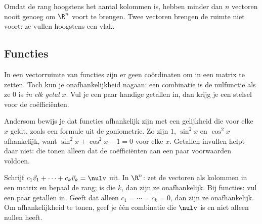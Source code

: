 Omdat de rang hoogstens het aantal kolommen is, hebben minder dan $n$ vectoren nooit genoeg om $\R^n$ voort te brengen. Twee vectoren brengen de ruimte niet voort: ze vullen hoogstens een vlak.


\begin{oefeningen}
\end{oefeningen}

\subsection{Functies}

In een vectorruimte van functies zijn er geen coördinaten om in een matrix te zetten. Toch kun je onafhankelijkheid nagaan: een combinatie is de nulfunctie als ze 0 is \textit{in elk getal} $x$. Vul je een paar handige getallen in, dan krijg je een stelsel voor de coëfficiënten.


Andersom bewijs je dat functies afhankelijk zijn met een gelijkheid die voor elke $x$ geldt, zoals een formule uit de goniometrie. Zo zijn $1$, $\sin^2 x$ en $\cos^2 x$ afhankelijk, want $\sin^2 x + \cos^2 x - 1 = 0$ voor elke $x$. Getallen invullen helpt daar niet: die tonen alleen dat de coëfficiënten aan een paar voorwaarden voldoen.

\begin{werkwijze}
Schrijf $c_1\vec v_1 + \cdots + c_k\vec v_k = \nulv$ uit. In $\R^n$: zet de vectoren als kolommen in een matrix en bepaal de rang; is die $k$, dan zijn ze onafhankelijk. Bij functies: vul een paar getallen in. Geeft dat alleen $c_1 = \cdots = c_k = 0$, dan zijn ze onafhankelijk. Om afhankelijkheid te tonen, geef je één combinatie die $\nulv$ is en niet alleen nullen heeft.
\end{werkwijze}

